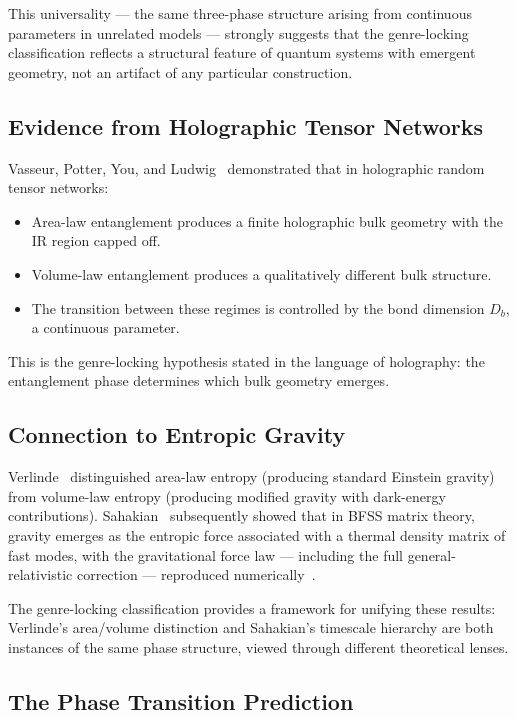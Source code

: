 \documentclass[aps,prd,twocolumn,superscriptaddress,nofootinbib,floatfix]{revtex4-2}
\begin{document}
This universality --- the same three-phase structure arising from continuous parameters in unrelated models --- strongly suggests that the genre-locking classification reflects a structural feature of quantum systems with emergent geometry, not an artifact of any particular construction.

\subsection{Evidence from Holographic Tensor Networks}

Vasseur, Potter, You, and Ludwig~\cite{VasseurPotterYouLudwig2019} demonstrated that in holographic random tensor networks:
\begin{itemize}
\item Area-law entanglement produces a finite holographic bulk geometry with the IR region capped off.
\item Volume-law entanglement produces a qualitatively different bulk structure.
\item The transition between these regimes is controlled by the bond dimension $D_b$, a continuous parameter.
\end{itemize}
This is the genre-locking hypothesis stated in the language of holography: the entanglement phase determines which bulk geometry emerges.

\subsection{Connection to Entropic Gravity}

Verlinde~\cite{Verlinde2017} distinguished area-law entropy (producing standard Einstein gravity) from volume-law entropy (producing modified gravity with dark-energy contributions). Sahakian~\cite{Sahakian2025} subsequently showed that in BFSS matrix theory, gravity emerges as the entropic force associated with a thermal density matrix of fast modes, with the gravitational force law --- including the full general-relativistic correction --- reproduced numerically~\cite{AldamTajimaSahakian2026}.

The genre-locking classification provides a framework for unifying these results: Verlinde's area/volume distinction and Sahakian's timescale hierarchy are both instances of the same phase structure, viewed through different theoretical lenses.

\subsection{The Phase Transition Prediction}
\end{document}
